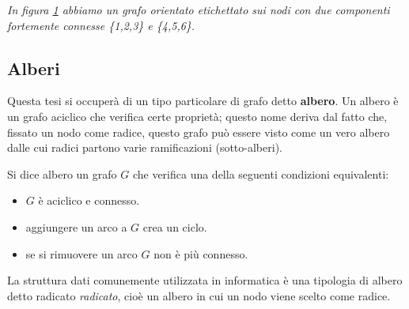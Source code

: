 \begin{example}
\begin{figure}[h]
\centering
{}
\caption{\label{fig:3}}
\end{figure}
\begin{center}
\textit{In figura \ref{fig:3} abbiamo un grafo orientato etichettato sui nodi con due componenti fortemente connesse \{1,2,3\} e \{4,5,6\}.}
\end{center}
\end{example}

\subsection{Alberi}
Questa tesi si occuperà di un tipo particolare di grafo detto \textbf{albero}. Un albero è un grafo aciclico che verifica certe proprietà; questo nome deriva dal fatto che, fissato un nodo come radice, questo grafo può essere visto come un vero albero dalle cui radici partono varie ramificazioni (sotto-alberi).
\begin{definition}[Albero]
Si dice albero un grafo $G$ che verifica una della seguenti condizioni equivalenti:
\begin{itemize}
\item $G$ è aciclico e connesso.
\item aggiungere un arco a $G$ crea un ciclo.
\item se si rimuovere un arco $G$ non è più connesso.
\end{itemize}
\end{definition}

La struttura dati comunemente utilizzata in informatica è una tipologia di albero detto radicato \emph{radicato}, cioè un albero in cui un nodo viene scelto come radice.


